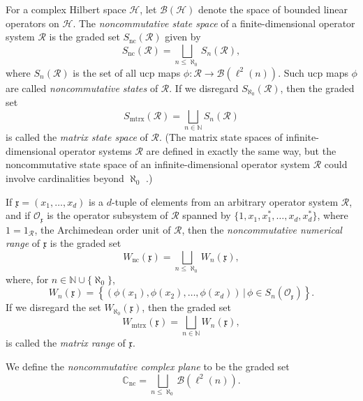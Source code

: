 \documentclass{amsart}
\theoremstyle{definition}
\theoremstyle{remark}
\newcommand{\B}{\mathcal{B}}
\renewcommand{\H}{\mathcal{H}}
\newcommand\osr{{\mathcal R}}
\numberwithin{equation}{section}
\begin{document}
For a complex Hilbert space $\H$, let $\B(\H)$ denote the space of bounded linear operators on $\H$. 
The \emph{noncommutative state space} of a finite-dimensional operator system $\osr$ is the graded set $S_{\textrm{nc}}(\osr)$ given by
\[
S_{\textrm{nc}}(\osr)= \bigsqcup_{n\leq\aleph_0} S_n(\osr),
\]
where $S_n(\osr)$ is the set of all ucp maps $\phi:\osr\rightarrow\B(\ell^2(n))$. Such ucp maps $\phi$
are called \emph{noncommutative states} of $\osr$.
If we disregard $S_{\aleph_0}(\osr)$, then the graded set
\[
S_{\textrm{mtrx}}(\osr)= \bigsqcup_{n\in\mathbb N} S_n(\osr)
\]
is called the \emph{matrix state space} of $\osr$. (The matrix state spaces of infinite-dimensional 
operator systems $\osr$ are defined in exactly the
same way, but the noncommutative state space of an infinite-dimensional operator system $\osr$ could involve cardinalities beyond $\aleph_0$
\cite{davidson--kennedy2019}.)

If $\mathfrak x=(x_1,\dots,x_d)$ is a $d$-tuple of elements from an arbitrary operator system $\osr$, 
and if $\mathcal O_{\mathfrak x}$ is the operator subsystem of $\osr$ spanned by $\{1,x_1,x_1^*,\dots,x_d,x_d^*\}$, where $1=1_\osr$, 
the Archimedean order unit of $\osr$, 
then the \emph{noncommutative numerical range} of $\mathfrak x$ is the graded set
\[
W_{\textrm{nc}}(\mathfrak x)= \bigsqcup_{n\leq\aleph_0} W_n(\mathfrak x),
\]
where, for $n\in\mathbb N\cup\{\aleph_0\}$,
\[
W_n(\mathfrak x)=\left\{ \left(\phi(x_1),\phi(x_2),\dots,\phi(x_d)\right)\,|\,\phi\in S_n(\mathcal O_{\mathfrak x})\right\}.
\]
If we disregard the set $W_{\aleph_0}(\mathfrak x)$, then the graded set
\[
W_{\textrm{mtrx}}(\mathfrak x)= \bigsqcup_{n\in\mathbb N} W_n(\mathfrak x),
\]
is called the \emph{matrix range} of $\mathfrak x$.

We define the \emph{noncommutative complex plane} to be the graded set 
\[
\mathbb C_{\textrm{nc}} = \bigsqcup_{n\leq\aleph_0} \B(\ell^2(n)).
\]
\end{document}
